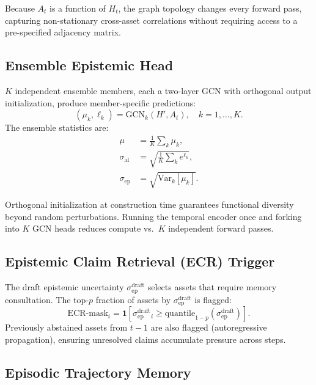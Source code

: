 \documentclass[11pt,a4paper]{article}
\newcommand{\sep}{\sigma_{\mathrm{ep}}}
\newcommand{\sal}{\sigma_{\mathrm{al}}}
\newcommand{\sepd}{\sigma_{\mathrm{ep}}^{\mathrm{draft}}}
\begin{document}
Because $A_t$ is a function of $H_t$, the graph topology changes every forward
pass, capturing non-stationary cross-asset correlations without requiring
access to a pre-specified adjacency matrix.

\subsection{Ensemble Epistemic Head}
\label{sec:ensemble}

$K$ independent ensemble members, each a two-layer GCN with orthogonal
output initialization, produce member-specific predictions:
\begin{equation}
  (\mu_k, \ell_k) = \mathrm{GCN}_k(H', A_t), \quad k = 1, \ldots, K.
\end{equation}
The ensemble statistics are:
\begin{align}
  \mu &= \frac{1}{K}\sum_k \mu_k, \\
  \sal &= \sqrt{\frac{1}{K}\sum_k e^{\ell_k}}, \label{eq:sal}\\
  \sep &= \sqrt{\mathrm{Var}_k[\mu_k]}. \label{eq:sep}
\end{align}

Orthogonal initialization at construction time guarantees functional diversity
beyond random perturbations.  Running the temporal encoder once and forking
into $K$ GCN heads reduces compute vs.\ $K$ independent forward passes.

\subsection{Epistemic Claim Retrieval (ECR) Trigger}
\label{sec:trigger}

The draft epistemic uncertainty $\sepd$ selects assets that require memory
consultation.  The top-$p$ fraction of assets by $\sepd$ is flagged:
\begin{equation}
  \mathrm{ECR\text{-}mask}_{i} =
    \mathbf{1}\!\left[\sepd_i \ge \mathrm{quantile}_{1-p}(\sepd)\right].
\end{equation}
Previously abstained assets from $t-1$ are also flagged (autoregressive
propagation), ensuring unresolved claims accumulate pressure across steps.

\subsection{Episodic Trajectory Memory}
\label{sec:memory}
\end{document}
